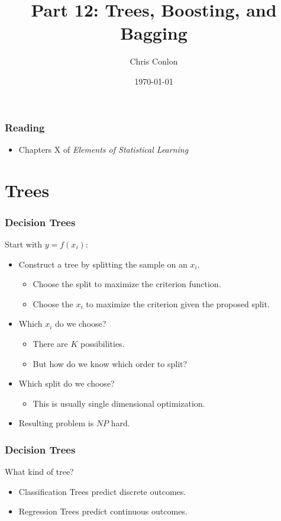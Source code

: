 \documentclass[xcolor=pdftex,dvipsnames,table,mathserif]{beamer}
\begin{document}
\title{Part 12: Trees, Boosting, and Bagging}
\author{Chris Conlon}
\date{\today}

\frame{\titlepage}


\begin{frame}
\frametitle{Reading}
\begin{itemize}
\item Chapters X of \textit{Elements of Statistical Learning}
\end{itemize}
\end{frame}



\section{Trees}
\begin{frame}
\frametitle{Decision Trees}
Start with $y = f(x_i)$:
\begin{itemize}
\item Construct a \alert{tree} by \alert{splitting} the sample on an $x_i$.
\begin{itemize}
\item Choose the split to maximize the criterion function.
\item Choose the $x_i$ to maximize the criterion given the proposed split.
\end{itemize}
\item Which $x_i$ do we choose?
\begin{itemize}
\item There are $K$ possibilities. 
\item But how do we know which order to split?
\end{itemize}
\item Which split do we choose?
\begin{itemize}
\item This is usually single dimensional optimization.
\end{itemize}
\item Resulting problem is $NP$ hard.
\end{itemize}
\end{frame}

\begin{frame}
\frametitle{Decision Trees}
What kind of tree?
\begin{itemize}
\item \alert{Classification} Trees predict \alert{discrete} outcomes.
\item \alert{Regression} Trees predict \alert{continuous} outcomes.
\end{itemize}
\end{frame}
\end{document}
